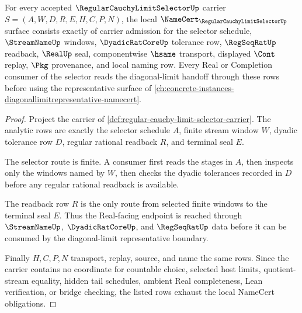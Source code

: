 \begin{theorem}
\label{thm:regular-cauchy-limit-selector-namecert-obligations}
For every accepted $\RegularCauchyLimitSelectorUp$ carrier $S=(A,W,D,R,E,H,C,P,N)$, the local $\NameCert_{\RegularCauchyLimitSelectorUp}$ surface consists exactly of carrier admission for the selector schedule, $\StreamNameUp$ windows, $\DyadicRatCoreUp$ tolerance row, $\RegSeqRatUp$ readback, $\RealUp$ seal, componentwise $\hsame$ transport, displayed $\Cont$ replay, $\Pkg$ provenance, and local naming row. Every Real or Completion consumer of the selector reads the diagonal-limit handoff through these rows before using the representative surface of \autoref{ch:concrete-instances-diagonallimitrepresentative-namecert}.
\end{theorem}
\begin{proof}
Project the carrier of \autoref{def:regular-cauchy-limit-selector-carrier}. The analytic rows are exactly the selector schedule $A$, finite stream window $W$, dyadic tolerance row $D$, regular rational readback $R$, and terminal seal $E$.

The selector route is finite. A consumer first reads the stages in $A$, then inspects only the windows named by $W$, then checks the dyadic tolerances recorded in $D$ before any regular rational readback is available.

The readback row $R$ is the only route from selected finite windows to the terminal seal $E$. Thus the Real-facing endpoint is reached through $\StreamNameUp$, $\DyadicRatCoreUp$, and $\RegSeqRatUp$ data before it can be consumed by the diagonal-limit representative boundary.

Finally $H,C,P,N$ transport, replay, source, and name the same rows. Since the carrier contains no coordinate for countable choice, selected host limits, quotient-stream equality, hidden tail schedules, ambient Real completeness, Lean verification, or bridge checking, the listed rows exhaust the local NameCert obligations.
\end{proof}


